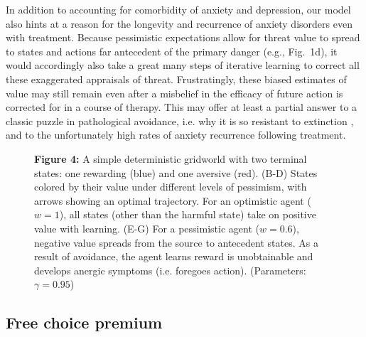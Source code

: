\documentclass[11pt]{article} %
\begin{document}
In addition to accounting for comorbidity of anxiety and depression, our model also hints at a reason for the longevity and recurrence of anxiety disorders even with treatment. Because pessimistic expectations allow for threat value to spread to states and actions far antecedent of the primary danger (e.g., Fig.~1d), it would accordingly also take a great many steps of iterative learning to correct all these exaggerated appraisals of threat. Frustratingly, these biased estimates of value may still remain even after a misbelief in the efficacy of future action is corrected for in a course of therapy. This may offer at least a partial answer to a classic puzzle in pathological avoidance, i.e. why it is so resistant to extinction \cite{moutoussis2018}, and to the unfortunately high rates of anxiety recurrence following treatment\citep{pittig2018}.

\begin{figure}[!b]
  \centerline{%
  }
  \par \textbf{Figure 4:} A simple deterministic gridworld with two terminal states: one rewarding (blue) and one aversive (red). (B-D) States colored by their value under different levels of pessimism, with arrows showing an optimal trajectory. For an optimistic agent ($w=1$), all states (other than the harmful state) take on positive value with learning. (E-G) For a pessimistic agent ($w=0.6$), negative value spreads from the source to antecedent states. As a result of avoidance, the agent learns reward is unobtainable and develops anergic symptoms (i.e. foregoes action). (Parameters: $\gamma = 0.95$)
\end{figure}

\subsection{Free choice premium}
\end{document}
